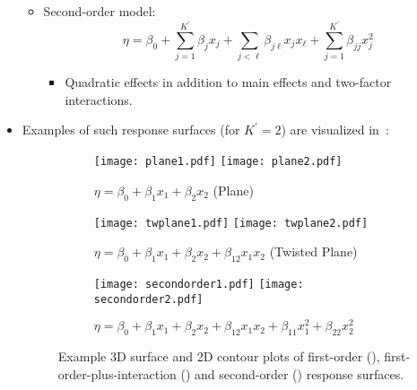 \begin{itemize}
\begin{itemize}
\begin{itemize}[$\hookrightarrow$]
                        \end{itemize}
                  \item Second-order model:
                        \[ \eta=\beta_0+\sum_{j=1}^{K^\prime}\beta_j x_j+\sum_{j<\ell}\beta_{j\ell}x_j x_\ell+\sum_{j=1}^{K^\prime}\beta_{jj}x_j^2  \]
                        \begin{itemize}[$\hookrightarrow$]
                              \item Quadratic effects in addition to main effects and two-factor interactions.
                        \end{itemize}
            \end{itemize}
      \item Examples of such response surfaces (for $ K^\prime=2 $) are visualized in~:
            \begin{figure}[!htbp]
                  \centering
                  \begin{subfigure}{0.5\textwidth}
                        \centering
                        \texttt{[image: plane1.pdf]}
                        \texttt{[image: plane2.pdf]}
                        \caption{$\eta=\beta_0+\beta_1x_1+\beta_2x_2$ (Plane)}\label{fig:plane}
                  \end{subfigure}
                  \begin{subfigure}{0.5\textwidth}
                        \centering
                        \texttt{[image: twplane1.pdf]}
                        \texttt{[image: twplane2.pdf]}
                        \caption{$\eta=\beta_0+\beta_1x_1+\beta_2x_2+\beta_{12}x_1x_2$ (Twisted Plane)}\label{fig:twplane}
                  \end{subfigure}
                  \begin{subfigure}{0.5\textwidth}
                        \centering
                        \texttt{[image: secondorder1.pdf]}
                        \texttt{[image: secondorder2.pdf]}
                        \caption{$\eta=\beta_0+\beta_1x_1+\beta_2x_2+\beta_{12}x_1x_2+\beta_{11}x_1^2+\beta_{22}x_2^2$}\label{fig:secondorder}
                  \end{subfigure}
                  \caption{Example 3D surface and 2D contour plots of first-order (), first-order-plus-interaction ()
                        and second-order () response surfaces.}\label{fig:respsurfaces}

\end{figure}
\end{itemize}
